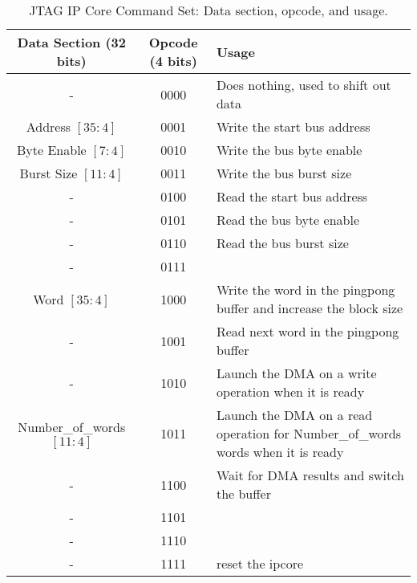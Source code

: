 \documentclass[a4paper,11pt,oneside]{report}
\begin{document}
\begin{table}[h!]
    \centering
    \begin{tabular}{|c|c|l|}
        \hline
        \textbf{Data Section (32 bits)} & \textbf{Opcode (4 bits)} & \textbf{Usage} \\
        \hline
        -                               & 0000                     & Does nothing, used to shift out data \\
        Address $[35:4]$                & 0001                     & Write the start bus address \\
        Byte Enable $[7:4]$             & 0010                     & Write the bus byte enable \\
        Burst Size $[11:4]$             & 0011                     & Write the bus burst size \\
        -                               & 0100                     & Read the start bus address \\
        -                               & 0101                     & Read the bus byte enable \\
        -                               & 0110                     & Read the bus burst size \\
        -                               & 0111                     &  \\
        Word $[35:4]$                   & 1000                     &  Write the word in the pingpong buffer and increase the block size\\
        -                               & 1001                     &  Read next word in the pingpong buffer\\
        -                               & 1010                     &  Launch the DMA on a write operation when it is ready\\
        Number\_of\_words $[11:4]$      & 1011                     &  Launch the DMA on a read operation for Number\_of\_words words when it is ready\\
        -                               & 1100                     &  Wait for DMA results and switch the buffer\\
        -                               & 1101                     & \\
        -                               & 1110                     & \\
        -                               & 1111                     &  reset the ipcore\\
        \hline
    \end{tabular}
    \caption{JTAG IP Core Command Set: Data section, opcode, and usage.}
    \label{tab:jtag_commands}
\end{table}
\end{document}
